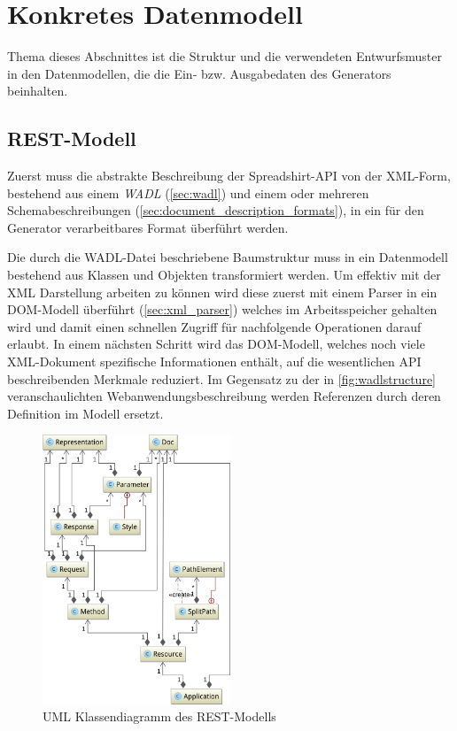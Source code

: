 \section{Konkretes Datenmodell}
\label{sec:concrete_model}

Thema dieses Abschnittes ist die Struktur und die verwendeten Entwurfsmuster in den Datenmodellen, die die Ein- bzw. Ausgabedaten des Generators beinhalten.

\subsection{REST-Modell}
\label{sec:rest_model}

Zuerst muss die abstrakte Beschreibung der Spreadshirt-API von der XML-Form, bestehend aus einem \emph{WADL} (\cref{sec:wadl}) und einem oder mehreren Schemabeschreibungen (\cref{sec:document_description_formats}), in ein für den Generator verarbeitbares Format überführt werden.

Die durch die WADL-Datei beschriebene Baumstruktur muss in ein Datenmodell bestehend aus Klassen und Objekten transformiert werden.
Um effektiv mit der XML Darstellung arbeiten zu können wird diese zuerst mit einem Parser in ein DOM-Modell überführt (\cref{sec:xml_parser}) welches im Arbeitsspeicher gehalten wird und damit einen schnellen Zugriff für nachfolgende Operationen darauf erlaubt. In einem nächsten Schritt wird das DOM-Modell, welches noch viele XML-Dokument spezifische Informationen enthält, auf die wesentlichen API beschreibenden Merkmale reduziert. Im Gegensatz zu der in \cref{fig:wadlstructure} veranschaulichten Webanwendungsbeschreibung werden Referenzen durch deren Definition im Modell ersetzt.

\begin{figure}[tb]
    \begin{center}
        \includegraphics[width=0.5\textwidth]{resources/restmodel}
    \end{center}
    \caption{UML Klassendiagramm des REST-Modells}
    \label{fig:restmodel}
\end{figure}


